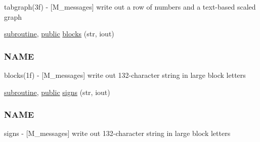 \begin{DoxyCompactItemize}
\begin{DoxyCompactList}
tabgraph(3f) -\/ \mbox{[}M\+\_\+messages\mbox{]} write out a row of numbers and a text-\/based scaled graph \end{DoxyCompactList}\item 
\hyperlink{M__stopwatch_83_8txt_acfbcff50169d691ff02d4a123ed70482}{subroutine}, \hyperlink{M__stopwatch_83_8txt_a2f74811300c361e53b430611a7d1769f}{public} \hyperlink{namespacem__messages_a91d3a2ecf1ca4868fdd9f18720a13136}{blocks} (str, iout)
\begin{DoxyCompactList}\small\item\em \subsubsection*{N\+A\+ME}

blocks(1f) -\/ \mbox{[}M\+\_\+messages\mbox{]} write out 132-\/character string in large block letters \end{DoxyCompactList}\item 
\hyperlink{M__stopwatch_83_8txt_acfbcff50169d691ff02d4a123ed70482}{subroutine}, \hyperlink{M__stopwatch_83_8txt_a2f74811300c361e53b430611a7d1769f}{public} \hyperlink{namespacem__messages_a239cb1269cc27d45176b9a278276d399}{signs} (str, iout)
\begin{DoxyCompactList}\small\item\em \subsubsection*{N\+A\+ME}

signs -\/ \mbox{[}M\+\_\+messages\mbox{]} write out 132-\/character string in large block letters \end{DoxyCompactList}\end{DoxyCompactItemize}
\textbf{ }\par
